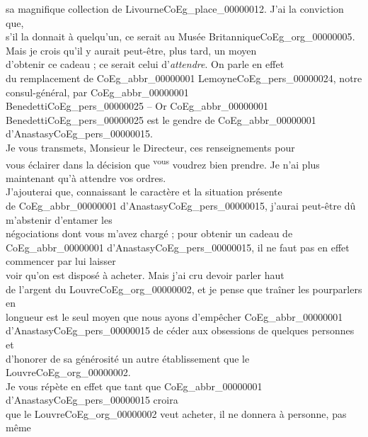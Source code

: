 \documentclass{book}
\begin{document}
sa magnifique collection de Livourne\gls{CoEg_place_00000012}. J’ai la conviction que,\\
s’il la donnait à quelqu’un, ce serait au Musée Britannique\gls{CoEg_org_00000005}.\\
\indent Mais je crois qu’il y aurait peut-être, plus tard, un moyen\\
d’obtenir ce cadeau ; ce serait celui d’\textit{attendre}. On parle en effet\\
du remplacement de \gls{CoEg_abbr_00000001} Lemoyne\gls{CoEg_pers_00000024}, notre consul-général, par \gls{CoEg_abbr_00000001}\\
Benedetti\gls{CoEg_pers_00000025} – Or \gls{CoEg_abbr_00000001} Benedetti\gls{CoEg_pers_00000025} est le gendre de \gls{CoEg_abbr_00000001} d’Anastasy\gls{CoEg_pers_00000015}.\\
\indent Je vous transmets, Monsieur le Directeur, ces renseignements pour\\
vous éclairer dans la décision que \textsuperscript{vous} voudrez bien prendre. Je n’ai plus\\
maintenant qu’à attendre vos ordres.\\
\indent J’ajouterai que, connaissant le caractère et la situation présente\\
de \gls{CoEg_abbr_00000001} d’Anastasy\gls{CoEg_pers_00000015}, j’aurai peut-être dû m’abstenir d’entamer les\\
négociations dont vous m’avez chargé ; pour obtenir un cadeau de\\
\gls{CoEg_abbr_00000001} d’Anastasy\gls{CoEg_pers_00000015}, il ne faut pas en effet commencer par lui laisser\\
voir qu’on est disposé à acheter. Mais j’ai cru devoir parler haut\\
de l’argent du Louvre\gls{CoEg_org_00000002}, et je pense que traîner les pourparlers en\\
longueur est le seul moyen que nous ayons d’empêcher \gls{CoEg_abbr_00000001}\\
d’Anastasy\gls{CoEg_pers_00000015} de céder aux obsessions de quelques personnes et\\
d’honorer de sa générosité un autre établissement que le Louvre\gls{CoEg_org_00000002}.\\
Je vous répète en effet que tant que \gls{CoEg_abbr_00000001} d’Anastasy\gls{CoEg_pers_00000015} croira\\
que le Louvre\gls{CoEg_org_00000002} veut acheter, il ne donnera à personne, pas même\\
\end{document}
